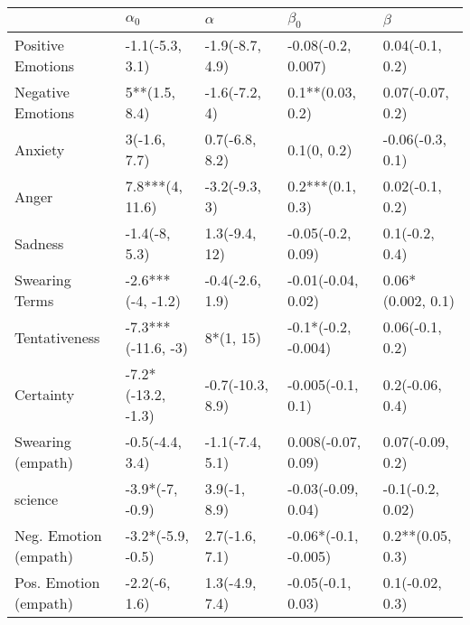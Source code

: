 \begin{tabular}{lllll}
\toprule
{} &          $\alpha_0$ &          $\alpha$ &             $\beta_0$ &            $\beta$ \\
\midrule
Positive Emotions     &     -1.1(-5.3, 3.1) &   -1.9(-8.7, 4.9) &    -0.08(-0.2, 0.007) &    0.04(-0.1, 0.2) \\
Negative Emotions     &       5**(1.5, 8.4) &     -1.6(-7.2, 4) &      0.1**(0.03, 0.2) &   0.07(-0.07, 0.2) \\
Anxiety               &        3(-1.6, 7.7) &    0.7(-6.8, 8.2) &           0.1(0, 0.2) &   -0.06(-0.3, 0.1) \\
Anger                 &     7.8***(4, 11.6) &     -3.2(-9.3, 3) &      0.2***(0.1, 0.3) &    0.02(-0.1, 0.2) \\
Sadness               &       -1.4(-8, 5.3) &     1.3(-9.4, 12) &     -0.05(-0.2, 0.09) &     0.1(-0.2, 0.4) \\
Swearing Terms        &   -2.6***(-4, -1.2) &   -0.4(-2.6, 1.9) &    -0.01(-0.04, 0.02) &  0.06*(0.002, 0.1) \\
Tentativeness         &  -7.3***(-11.6, -3) &         8*(1, 15) &   -0.1*(-0.2, -0.004) &    0.06(-0.1, 0.2) \\
Certainty             &  -7.2*(-13.2, -1.3) &  -0.7(-10.3, 8.9) &     -0.005(-0.1, 0.1) &    0.2(-0.06, 0.4) \\
Swearing (empath)     &     -0.5(-4.4, 3.4) &   -1.1(-7.4, 5.1) &    0.008(-0.07, 0.09) &   0.07(-0.09, 0.2) \\
science               &     -3.9*(-7, -0.9) &      3.9(-1, 8.9) &    -0.03(-0.09, 0.04) &   -0.1(-0.2, 0.02) \\
Neg. Emotion (empath) &   -3.2*(-5.9, -0.5) &    2.7(-1.6, 7.1) &  -0.06*(-0.1, -0.005) &   0.2**(0.05, 0.3) \\
Pos. Emotion (empath) &       -2.2(-6, 1.6) &    1.3(-4.9, 7.4) &     -0.05(-0.1, 0.03) &    0.1(-0.02, 0.3) \\
\bottomrule
\end{tabular}
